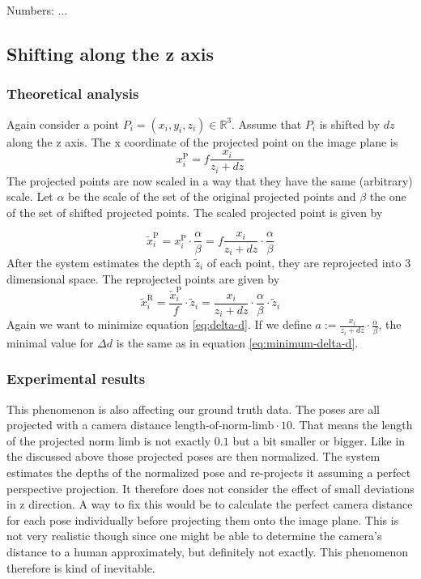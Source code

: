 	Numbers: ...
	
\subsection{Shifting along the z axis}
\label{sec:z-shift-error}
\subsubsection{Theoretical analysis}
Again consider a point $P_i=(x_i, y_i, z_i) \in \mathbb{R}^3$. Assume that $P_i$ is shifted by $dz$ along the z axis.
The x coordinate of the projected point on the image plane is
\begin{equation}
	x_i^\mathrm{P} = f \frac{x_i}{z_i + dz}
\end{equation}
The projected points are now scaled in a way that they have the same (arbitrary) scale.  Let $\alpha$ be the scale of the set of the original projected points and $\beta$ the one of the set of shifted projected points. The scaled projected point is given by

\begin{equation}
		\widetilde{x}_i^\mathrm{P} = x_i^\mathrm{P} \cdot \frac{\alpha}{\beta} 
		= f \frac{x_i}{z_i + dz}\cdot \frac{\alpha}{\beta} 
\end{equation}
After the system estimates the depth $\widetilde{z}_i$ of each point, they are reprojected into 3 dimensional space.
The reprojected points are given by
\begin{equation}
	\widetilde{x}_i^\mathrm{R} = \frac{\widetilde{x}_i^\mathrm{P}}{f} \cdot \widetilde{z}_i
	= \frac{x_i}{z_i + dz}\cdot \frac{\alpha}{\beta}  \cdot \widetilde{z}_i
\end{equation}
Again we want to minimize equation \eqref{eq:delta-d}.
If we define $a := \frac{x_i}{z_i + dz}\cdot \frac{\alpha}{\beta}$, the minimal value for $\Delta d$ is the same as in equation \eqref{eq:minimum-delta-d}.


\subsubsection{Experimental results}
	This phenomenon is also affecting our ground truth data. The poses are all projected with a camera distance $ \text{length-of-norm-limb} \cdot 10$. 
	That means the length of the projected norm limb is not exactly $0.1$ but a bit smaller or bigger. 
	Like in the discussed above those projected poses are then normalized. 
	The system estimates the depths of the normalized pose and re-projects it assuming a perfect perspective projection. 
	It therefore does not consider the effect of small deviations in z direction.
	A way to fix this would be to calculate the perfect camera distance for each pose individually before projecting them onto the image plane.
	This is not very realistic though since one might be able to determine the camera's distance to a human approximately, but definitely not exactly. This phenomenon therefore is kind of inevitable.
 
